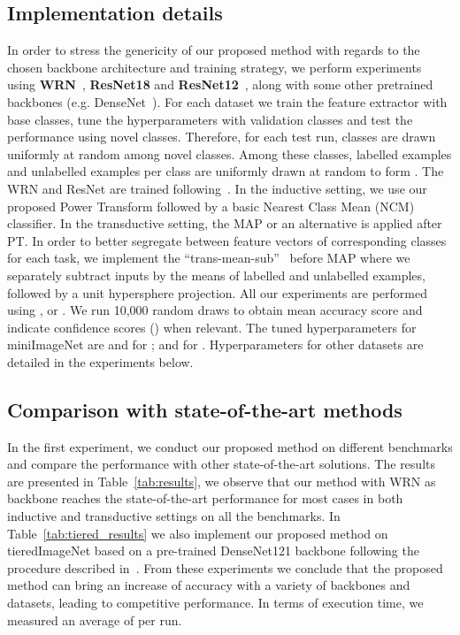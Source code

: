 \documentclass[twoside]{article}
\begin{document}
\subsection{Implementation details}
In order to stress the genericity of our proposed method with regards to the chosen backbone architecture and training strategy, we perform experiments using \textbf{WRN}~\cite{zagoruyko2016wide}, \textbf{ResNet18} and \textbf{ResNet12}~\cite{he2016deep}, along with some other pretrained backbones (e.g. DenseNet~\cite{huang2017densely}). For each dataset we train the feature extractor with base classes, tune the hyperparameters with validation classes and test the performance using novel classes. Therefore, for each test run,  classes are drawn uniformly at random among novel classes. Among these  classes,  labelled examples and  unlabelled examples per class are uniformly drawn at random to form . The WRN and ResNet are trained following~\cite{mangla2020charting}. In the inductive setting, we use our proposed Power Transform followed by a basic Nearest Class Mean (NCM) classifier. In the transductive setting, the MAP or an alternative is applied after PT. In order to better segregate between feature vectors of corresponding classes for each task, we implement the ``trans-mean-sub''~\cite{lichtenstein2020tafssl} before MAP where we separately subtract inputs by the means of labelled and unlabelled examples, followed by a unit hypersphere projection. All our experiments are performed using ,  or . We run 10,000 random draws to obtain mean accuracy score and indicate confidence scores () when relevant. The tuned hyperparameters for miniImageNet are  and  for ;  and  for . Hyperparameters for other datasets are detailed in the experiments below. 

\subsection{Comparison with state-of-the-art methods}

In the first experiment, we conduct our proposed method on different benchmarks and compare the performance with other state-of-the-art solutions. The results are presented in Table~\ref{tab:results}, we observe that our method with WRN as backbone reaches the state-of-the-art performance for most cases in both inductive and transductive settings on all the benchmarks. In Table~\ref{tab:tiered_results} we also implement our proposed method on tieredImageNet based on a pre-trained DenseNet121 backbone following the procedure described in~\cite{wang2019simpleshot}. From these experiments we conclude that the proposed method can bring an increase of accuracy with a variety of backbones and datasets, leading to competitive performance. In terms of execution time, we measured an average of  per run.
\end{document}
